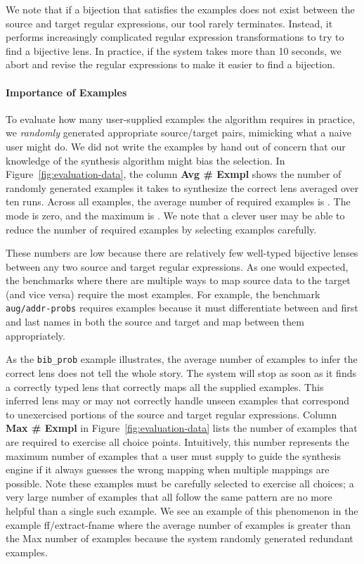 \documentclass[numbers,10pt,preprint\ifanon ,nocopyrightspace\fi]{sigplanconf}
\begin{document}

We note that if a bijection that satisfies the examples does not exist
between the source and target regular expressions, our tool rarely
terminates.  Instead, it performs increasingly complicated regular
expression transformations to try to find a bijective lens.  In
practice, if the system takes more than 10 seconds, we abort and
revise the regular expressions to make it easier to find a bijection.


\paragraph*{Importance of Examples}
To evaluate how many user-supplied examples the algorithm requires in
practice, we \textit{randomly} generated appropriate source/target
pairs, mimicking what a naive user might do.  We did not write the
examples by hand out of concern that our knowledge of the synthesis
algorithm might bias the selection.  In
Figure~\ref{fig:evaluation-data}, the column \textbf{Avg \# Exmpl} shows
the number of randomly generated examples it takes to synthesize the
correct lens averaged over ten runs.  Across all examples, the average
number of required examples is . The mode is zero, and the
maximum is .  We note that a clever user may be able to reduce the
number of required examples by selecting examples carefully.

These numbers are low because there are relatively few well-typed
bijective lenses between any two source and target regular expressions. 
As one would expected, the benchmarks where there are multiple ways to
map source data to the target (and vice versa) require the most examples.
For example, the benchmark \texttt{aug/addr-probs} requires examples because it
must differentiate between and first and last names in both the
source and target and map between them appropriately.

As the \texttt{bib\_prob} example illustrates, the average number of examples to
infer the correct lens does not tell the whole story.  The system will
stop as soon as it finds a correctly typed lens that correctly maps
all the supplied examples.  This inferred lens may or may not
correctly handle unseen examples that correspond to
unexercised portions of the source and target regular expressions.
Column \textbf{Max \# Exmpl} in Figure~\ref{fig:evaluation-data} lists
the number of examples that are required to exercise all choice
points.  Intuitively, this number represents the maximum number of
examples that a user must supply to guide the synthesis engine if it
always guesses the wrong mapping when multiple mappings are possible.
Note these examples must be carefully selected to exercise all
choices; a very large number of examples that all follow the same
pattern are no more helpful than a single such example.  We see an
example of this phenomenon in the example ff/extract-fname where the
average number of examples is greater than the Max number of examples
because the system randomly generated redundant examples.
\end{document}
